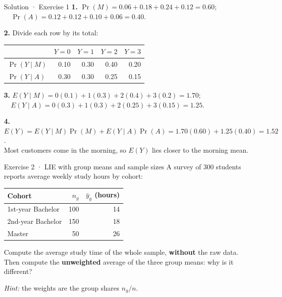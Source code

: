 \documentclass[
  11pt,
  ignorenonframetext,
  aspectratio=169,
]{beamer}
\begin{document}
\begin{frame}[shrink=5]{Solution · Exercise 1}
\textbf{1.} \(\Pr(M)=0.06+0.18+0.24+0.12=\mathbf{0.60}\);
\(\quad \Pr(A)=0.12+0.12+0.10+0.06=\mathbf{0.40}\).

\medskip
\textbf{2.} Divide each row by its total:

\begin{center}
\begin{tabular}{@{}lrrrr@{}}
\toprule
 & \(Y=0\) & \(Y=1\) & \(Y=2\) & \(Y=3\) \\
\midrule
\(\Pr(Y\mid M)\) & 0.10 & 0.30 & 0.40 & 0.20 \\
\(\Pr(Y\mid A)\) & 0.30 & 0.30 & 0.25 & 0.15 \\
\bottomrule
\end{tabular}
\end{center}

\textbf{3.} \(E(Y\mid M)=0(0.1)+1(0.3)+2(0.4)+3(0.2)=\mathbf{1.70}\);
\(\quad E(Y\mid A)=0(0.3)+1(0.3)+2(0.25)+3(0.15)=\mathbf{1.25}\).

\medskip
\textbf{4.} \(E(Y)=E(Y\mid M)\Pr(M)+E(Y\mid A)\Pr(A)=1.70(0.60)+1.25(0.40)=\mathbf{1.52}\).\\
Most customers come in the morning, so \(E(Y)\) lies closer to the morning mean.
\end{frame}


\begin{frame}{Exercise 2 · LIE with group means and sample sizes}
\protect{}\label{exercise-2-lie-with-group-means-and-sample-sizes}
A survey of 300 students reports average weekly study hours by cohort:

\begin{center}
\begin{tabular}{@{}lrr@{}}
\toprule
Cohort & \(n_g\) & \(\bar y_g\) (hours) \\
\midrule
1st-year Bachelor & 100 & 14 \\
2nd-year Bachelor & 150 & 18 \\
Master & 50 & 26 \\
\bottomrule
\end{tabular}
\end{center}

Compute the average study time of the whole sample, \textbf{without} the
raw data. Then compute the \textbf{unweighted} average of the three
group means: why is it different?

\emph{Hint:} the weights are the group shares \(n_g/n\).
\end{frame}
\end{document}

